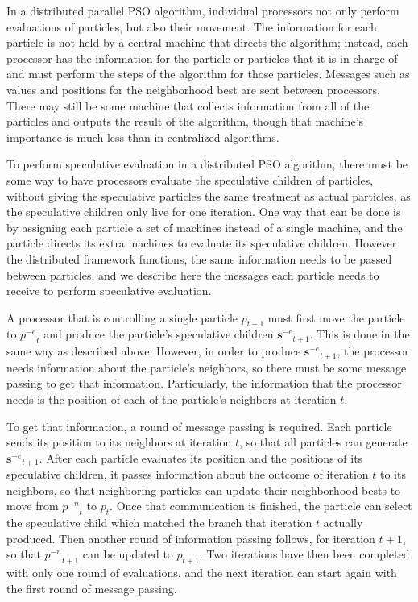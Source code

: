 \documentclass[journal,letterpaper]{IEEEtran}
\providecommand{\noeval}[1]{\ensuremath{#1^{-e}}}
\providecommand{\nonbest}[1]{\ensuremath{#1^{-n}}}
\providecommand{\p}{\ensuremath{p}}
\providecommand{\sset}{\ensuremath{\mathbf{s}}}
\begin{document}
In a distributed parallel PSO algorithm, individual processors not only perform
evaluations of particles, but also their movement.  The information for each
particle is not held by a central machine that directs the algorithm; instead,
each processor has the information for the particle or particles that it is in
charge of and must perform the steps of the algorithm for those particles.
Messages such as values and positions for the neighborhood best are sent
between processors.  There may still be some machine that collects information
from all of the particles and outputs the result of the algorithm, though that
machine's importance is much less than in centralized algorithms.

To perform speculative evaluation in a distributed PSO algorithm, there must be
some way to have processors evaluate the speculative children of particles,
without giving the speculative particles the same treatment as actual
particles, as the speculative children only live for one iteration.  One way
that can be done is by assigning each particle a set of machines instead of a
single machine, and the particle directs its extra machines to evaluate its
speculative children.  However the distributed framework functions, the same
information needs to be passed between particles, and we describe here the
messages each particle needs to receive to perform speculative evaluation.

A processor that is controlling a single particle $\p_{t-1}$ must first move
the particle to $\noeval{\p}_t$ and produce the particle's speculative children
$\noeval{\sset}_{t+1}$.  This is done in the same way as described above.
However, in order to produce $\noeval{\sset}_{t+1}$, the processor needs
information about the particle's neighbors, so there must be some message
passing to get that information.  Particularly, the information that the
processor needs is the position of each of the particle's neighbors at
iteration $t$.

To get that information, a round of message passing is required.  Each particle
sends its position to its neighbors at iteration $t$, so that all particles can
generate $\noeval{\sset}_{t+1}$.  After each particle evaluates its position
and the positions of its speculative children, it passes information about the
outcome of iteration $t$ to its neighbors, so that neighboring particles can
update their neighborhood bests to move from $\nonbest{\p}_t$ to $\p_t$.  Once
that communication is finished, the particle can select the speculative child
which matched the branch that iteration $t$ actually produced.  Then another
round of information passing follows, for iteration $t+1$, so that
$\nonbest{\p}_{t+1}$ can be updated to $\p_{t+1}$.  Two iterations have then
been completed with only one round of evaluations, and the next iteration can
start again with the first round of message passing.
\end{document}
